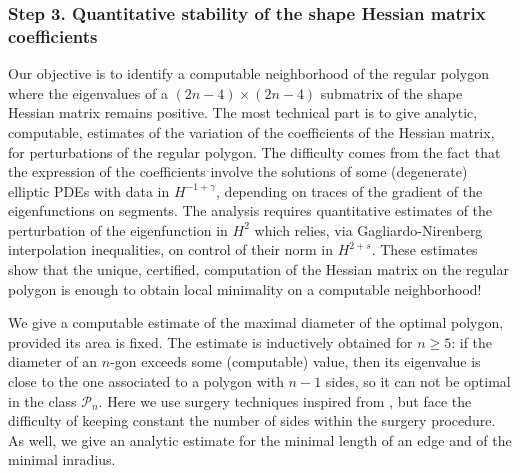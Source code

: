 \subsubsection*{Step 3. Quantitative stability of the shape Hessian matrix coefficients}
Our objective is to identify a computable neighborhood of the regular polygon where the eigenvalues of a $(2n-4)\times (2n-4)$ submatrix of the shape Hessian matrix remains positive. The most technical part is to give analytic, computable, estimates of the variation of the coefficients of the Hessian matrix, for perturbations of the regular polygon. The difficulty comes from the fact that the expression of the coefficients involve the solutions of some (degenerate) elliptic PDEs with data in $H^{-1+\gamma}$, depending on traces of the gradient of the eigenfunctions on segments. The analysis requires quantitative estimates of the perturbation of the eigenfunction in $H^2$ which relies, via Gagliardo-Nirenberg interpolation inequalities, on control of their norm in $H^{2+s}$.
These estimates
show that the unique, certified, computation of the Hessian matrix on the regular polygon is enough to obtain local minimality on a computable neighborhood!

We give a computable estimate of the maximal diameter of the optimal polygon, provided its area is fixed. The estimate is inductively obtained for $n \ge 5$: if the diameter of an $n$-gon exceeds some (computable) value, then its eigenvalue is close to the one associated to a polygon with $n-1$ sides, so it can not be optimal in the class ${\mathcal P}_n$. Here we use surgery techniques inspired from \cite{BuMa15}, but face the difficulty of keeping constant the number of sides within the surgery procedure.
As well, we give an analytic estimate for the minimal length of an edge and of the minimal inradius.

